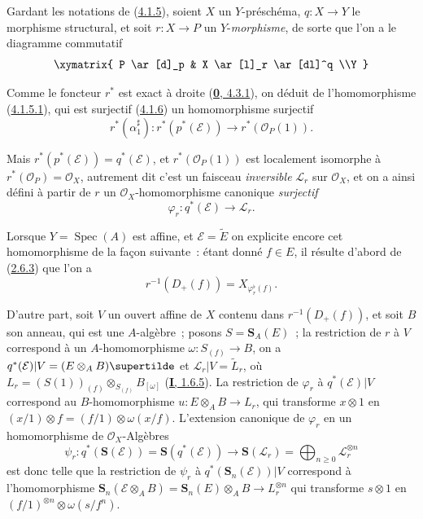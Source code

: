 \begin{env}[4.2.1]
\label{II.4.2.1-fr}
Gardant les notations de (\hyperref[II.4.1.5-fr]{4.1.5}), soient $X$ un
$Y$-préschéma, $q:X\to Y$ le morphisme structural, et soit $r:X\to P$ un
$Y$-\emph{morphisme}, de sorte que l'on a le diagramme commutatif
\[
  \xymatrix{
    P \ar[d]_p & X \ar[l]_r \ar[dl]^q
    \\Y
  }
\]


Comme le foncteur $r^*$ est exact à droite
(\hyperref[0.4.3.1-fr]{\textbf{0}, 4.3.1}), on déduit de l'homomorphisme
(\hyperref[II.4.1.5.1-fr]{4.1.5.1}), qui est surjectif
(\hyperref[II.4.1.6-fr]{4.1.6}) un homomorphisme surjectif
\[
  r^*(\alpha_1^\sharp):r^*(p^*(\mathcal{E}))\longrightarrow
  r^*(\mathcal{O}_P(1)).
\]

Mais $r^*(p^*(\mathcal{E}))=q^*(\mathcal{E})$, et
$r^*(\mathcal{O}_P(1))$ est localement isomorphe à
$r^*(\mathcal{O}_P)=\mathcal{O}_X$, autrement dit c'est un faisceau
\emph{inversible} $\mathcal{L}_r$ sur $\mathcal{O}_X$, et on a ainsi défini à partir
de $r$ un $\mathcal{O}_X$-homomorphisme canonique \emph{surjectif}
\[
\label{II.4.2.1.1-fr}
  \varphi_r:q^*(\mathcal{E})\longrightarrow\mathcal{L}_r.
\tag{4.2.1.1}
\]

Lorsque $Y=\operatorname{Spec}(A)$ est affine, et
$\mathcal{E}=\widetilde{E}$ on explicite encore cet homomorphisme de la façon
suivante~: étant donné $f\in E$, il résulte d'abord de
(\hyperref[II.2.6.3-fr]{2.6.3}) que l'on a
\[
\label{II.4.2.1.2-fr}
  r^{-1}(D_+(f))=X_{\varphi_r^\flat(f)}.
\tag{4.2.1.2}
\]

D'autre part, soit $V$ un ouvert affine de $X$ contenu dans
$r^{-1}(D_+(f))$, et soit $B$ son anneau, qui est une $A$-algèbre~; posons
$S=\mathbf{S}_A(E)$~; la restriction de $r$ à $V$ correspond à un
$A$-homomorphisme $\omega:S_{(f)}\to B$, on a
$q^*(\mathcal{E})|V=(E\otimes_A B)\supertilde$ et
$\mathcal{L}_r|V=\widetilde{L}_r$, où
$L_r=(S(1))_{(f)}\otimes_{S_{(f)}}B_{[\omega]}$
(\hyperref[I.1.6.5-fr]{\textbf{I}, 1.6.5}). La restriction de $\varphi_r$ à
$q^*(\mathcal{E})|V$ correspond au $B$-homomorphisme
$u:E\otimes_A B\to L_r$, qui transforme $x\otimes1$ en
$(x/1)\otimes f=(f/1)\otimes\omega(x/f)$. L'extension canonique de
$\varphi_r$ en un homomorphisme de $\mathcal{O}_X$-Algèbres
\[
  \psi_r:q^*(\mathbf{S}(\mathcal{E}))=
  \mathbf{S}(q^*(\mathcal{E}))\longrightarrow
  \mathbf{S}(\mathcal{L}_r)=\bigoplus_{n\geq0}\mathcal{L}_r^{\otimes n}
\]
est donc telle que la restriction de $\psi_r$ à
$q^*(\mathbf{S}_n(\mathcal{E}))|V$ correspond à l'homomorphisme
$\mathbf{S}_n(\mathcal{E}\otimes_A B)=\mathbf{S}_n(E)\otimes_A B\to L_r^{\otimes n}$
qui transforme $s\otimes1$ en
$(f/1)^{\otimes n}\otimes\omega(s/f^n)$.
\end{env}

